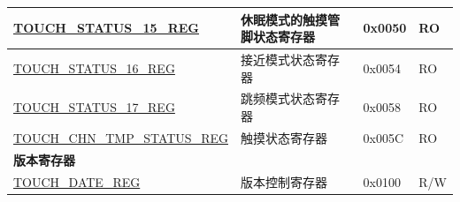 \begin{longtable}{ | l | p{8cm} | p{1.3cm} | p{1.7cm} | }
\hyperref[regdesc:TOUCHSTATUS15REG]{TOUCH\_STATUS\_15\_REG} & 休眠模式的触摸管脚状态寄存器 & 0x0050 & RO \\ \hline
\hyperref[regdesc:TOUCHSTATUS16REG]{TOUCH\_STATUS\_16\_REG} & 接近模式状态寄存器 & 0x0054 & RO \\ \hline
\hyperref[regdesc:TOUCHSTATUS17REG]{TOUCH\_STATUS\_17\_REG} & 跳频模式状态寄存器 & 0x0058 & RO \\ \hline
\hyperref[regdesc:TOUCHCHNTMPSTATUSREG]{TOUCH\_CHN\_TMP\_STATUS\_REG} & 触摸状态寄存器 & 0x005C & RO \\ \hline
\multicolumn{4}{|l|}{\textbf{版本寄存器}} \\ \hline
\hyperref[regdesc:TOUCHDATEREG]{TOUCH\_DATE\_REG} & 版本控制寄存器 & 0x0100 & R/W \\ \hline
\end{longtable}
